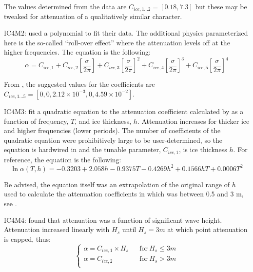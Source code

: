 \noindent
The values determined from the data are ${C_{ice,1...2}}=[0.18, 7.3]$ but these may be tweaked for attenuation of a qualitatively similar character. 

{\code IC4M2}: \cite{art:MBK14} used a polynomial to fit their data. The additional physics parameterized here is the so-called “roll-over effect” where the attenuation levels off at the higher frequencies. The equation is the following:
\begin{equation}\label{eq:ice2}
  {\alpha} = C_{ice,1} + C_{ice,2}\left[{\frac{\sigma}{2\pi}}\right] + C_{ice,3}\left[{\frac{\sigma}{2\pi}}\right]^2 + C_{ice,4}\left[{\frac{\sigma}{2\pi}}\right]^3 + C_{ice,5}\left[{\frac{\sigma}{2\pi}}\right]^4
\end{equation}

\noindent
From \cite{art:MBK14}, the suggested values for the coefficients are ${C_{ice,1...5}}=[0, 0, 2.12\times 10^{-3}, 0, 4.59\times 10^{-2}]$.

{\code IC4M3}: \cite{art:HT15} fit a quadratic equation to the attenuation coefficient calculated by \cite{art:KM08} as a function of frequency, $T$, and ice thickness, $h$. Attenuation increases for thicker ice and higher frequencies (lower periods). The number of  coefficients of the quadratic equation were prohibitively large to be user-determined, so the equation is hardwired in and the tunable parameter, ${C_{ice,1}}$, is ice thickness  $h$. For reference, the equation is the following:
\begin{equation}\label{eq:ice3}
  {\ln{\alpha(T,h)}} = -0.3203 + 2.058h - 0.9375T - 0.4269h^2 + 0.1566hT + 0.0006T^2
\end{equation}

\noindent
Be advised, the equation itself was an extrapolation of the original range of $h$ used to calculate the attenuation coefficients in \cite{art:KM08} which was between 0.5 and 3 m, see \cite{art:HT15}. 

{\code IC4M4}: \cite{art:Ko14} found that attenuation was a function of significant wave height. Attenuation increased linearly with ${H_s}$ until ${H_s} = 3 m$ at which point attenuation is capped, thus:
\begin{equation}
\left \{
\begin{array}{llrcl}
{\alpha} = {C_{ice,1}}\times {H_s}   & & \text{for} \> {H_s} \leq 3 m  \\
{\alpha} = {C_{ice,2}}               & & \text{for} \> {H_s} > 3 m     \\
\end{array} \right .
\end{equation}

